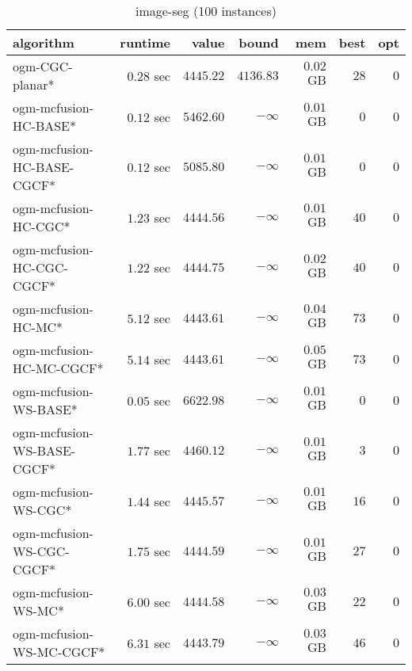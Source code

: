 \begin{table}[H]
\scriptsize
\centering
\caption{image-seg (100 instances)}
\label{tab:smalltable-image-seg}
\begin{tabular}{lrrrrrr}
\toprule
           algorithm &       runtime     &         value &         bound &           mem &     best &      opt   \\ \midrule 
     ogm-CGC-planar* & $         0.28$ sec & $      4445.22$ & $      4136.83$ & $         0.02$ GB & $      28$ & $       0$ \\ 
ogm-mcfusion-HC-BASE* & $         0.12$ sec & $      5462.60$ & $-\infty$ & $         0.01$ GB & $       0$ & $       0$ \\ 
ogm-mcfusion-HC-BASE-CGCF* & $         0.12$ sec & $      5085.80$ & $-\infty$ & $         0.01$ GB & $       0$ & $       0$ \\ 
ogm-mcfusion-HC-CGC* & $         1.23$ sec & $      4444.56$ & $-\infty$ & $         0.01$ GB & $      40$ & $       0$ \\ 
ogm-mcfusion-HC-CGC-CGCF* & $         1.22$ sec & $      4444.75$ & $-\infty$ & $         0.02$ GB & $      40$ & $       0$ \\ 
 ogm-mcfusion-HC-MC* & $         5.12$ sec & $      4443.61$ & $-\infty$ & $         0.04$ GB & $      73$ & $       0$ \\ 
ogm-mcfusion-HC-MC-CGCF* & $         5.14$ sec & $      4443.61$ & $-\infty$ & $         0.05$ GB & $      73$ & $       0$ \\ 
ogm-mcfusion-WS-BASE* & $         0.05$ sec & $      6622.98$ & $-\infty$ & $         0.01$ GB & $       0$ & $       0$ \\ 
ogm-mcfusion-WS-BASE-CGCF* & $         1.77$ sec & $      4460.12$ & $-\infty$ & $         0.01$ GB & $       3$ & $       0$ \\ 
ogm-mcfusion-WS-CGC* & $         1.44$ sec & $      4445.57$ & $-\infty$ & $         0.01$ GB & $      16$ & $       0$ \\ 
ogm-mcfusion-WS-CGC-CGCF* & $         1.75$ sec & $      4444.59$ & $-\infty$ & $         0.01$ GB & $      27$ & $       0$ \\ 
 ogm-mcfusion-WS-MC* & $         6.00$ sec & $      4444.58$ & $-\infty$ & $         0.03$ GB & $      22$ & $       0$ \\ 
ogm-mcfusion-WS-MC-CGCF* & $         6.31$ sec & $      4443.79$ & $-\infty$ & $         0.03$ GB & $      46$ & $       0$ \\ 
\bottomrule
\end{tabular}
\end{table}
